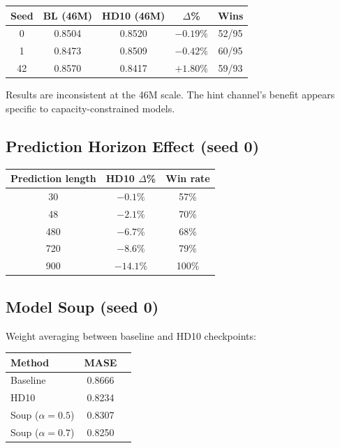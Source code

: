 \documentclass[11pt]{article}
\begin{document}
\begin{table}[h]
\centering
\small
\begin{tabular}{ccccc}
\toprule
\textbf{Seed} & \textbf{BL (46M)} & \textbf{HD10 (46M)} & \textbf{$\Delta$\%} & \textbf{Wins} \\
\midrule
0 & 0.8504 & 0.8520 & $-0.19\%$ & 52/95 \\
1 & 0.8473 & 0.8509 & $-0.42\%$ & 60/95 \\
42 & 0.8570 & 0.8417 & $+1.80\%$ & 59/93 \\
\bottomrule
\end{tabular}
\end{table}

Results are inconsistent at the 46M scale. The hint channel's benefit appears specific to capacity-constrained models.

\subsection{Prediction Horizon Effect (seed 0)}

\begin{table}[h]
\centering
\small
\begin{tabular}{ccc}
\toprule
\textbf{Prediction length} & \textbf{HD10 $\Delta$\%} & \textbf{Win rate} \\
\midrule
30 & $-0.1\%$ & 57\% \\
48 & $-2.1\%$ & 70\% \\
480 & $-6.7\%$ & 68\% \\
720 & $-8.6\%$ & 79\% \\
900 & $-14.1\%$ & 100\% \\
\bottomrule
\end{tabular}
\end{table}

\subsection{Model Soup (seed 0)}

Weight averaging between baseline and HD10 checkpoints:

\begin{table}[h]
\centering
\small
\begin{tabular}{lcc}
\toprule
\textbf{Method} & \textbf{MASE} \\
\midrule
Baseline & 0.8666 \\
HD10 & 0.8234 \\
Soup ($\alpha=0.5$) & 0.8307 \\
Soup ($\alpha=0.7$) & 0.8250 \\
\bottomrule
\end{tabular}
\end{table}
\end{document}
